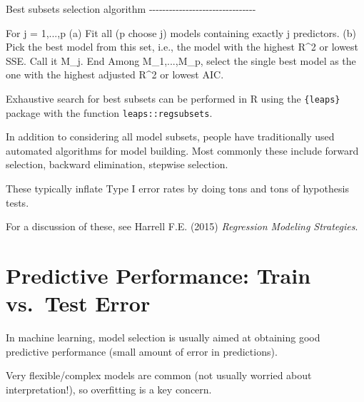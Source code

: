 \documentclass[
  letterpaper,
  DIV=11,
  numbers=noendperiod]{scrreport}
\newenvironment{Shaded}{\begin{snugshade}}{\end{snugshade}}
\newcommand{\DecValTok}[1]{\textcolor[rgb]{0.68,0.00,0.00}{#1}}
\newcommand{\KeywordTok}[1]{\textcolor[rgb]{0.00,0.23,0.31}{#1}}
\newcommand{\NormalTok}[1]{\textcolor[rgb]{0.00,0.23,0.31}{#1}}
\newcommand{\OperatorTok}[1]{\textcolor[rgb]{0.37,0.37,0.37}{#1}}
\begin{document}
\begin{Shaded}
\begin{Highlighting}[]
\NormalTok{Best subsets selection algorithm}
\OperatorTok{{-}{-}{-}{-}{-}{-}{-}{-}{-}{-}{-}{-}{-}{-}{-}{-}{-}{-}{-}{-}{-}{-}{-}{-}{-}{-}{-}{-}{-}{-}{-}{-}}
  
\NormalTok{For j }\OperatorTok{=} \DecValTok{1}\OperatorTok{,...,}\NormalTok{p}
  \OperatorTok{(}\NormalTok{a}\OperatorTok{)}\NormalTok{ Fit all }\OperatorTok{(}\NormalTok{p choose j}\OperatorTok{)}\NormalTok{ models containing exactly j predictors}\OperatorTok{.}
  \OperatorTok{(}\NormalTok{b}\OperatorTok{)}\NormalTok{ Pick the best model from }\KeywordTok{this}\NormalTok{ set}\OperatorTok{,}\NormalTok{ i}\OperatorTok{.}\NormalTok{e}\OperatorTok{.,}\NormalTok{ the model with the highest R}\OperatorTok{\^{}}\DecValTok{2}
      \KeywordTok{or}\NormalTok{ lowest SSE}\OperatorTok{.}\NormalTok{ Call it M\_j}\OperatorTok{.}
\NormalTok{End}
\NormalTok{Among M\_1}\OperatorTok{,...,}\NormalTok{M\_p}\OperatorTok{,}\NormalTok{ select the single best model as the one with the highest}
\NormalTok{adjusted R}\OperatorTok{\^{}}\DecValTok{2} \KeywordTok{or}\NormalTok{ lowest AIC}\OperatorTok{.}
\end{Highlighting}
\end{Shaded}

Exhaustive search for best subsets can be performed in R using the
\texttt{\{leaps\}} package with the function \texttt{leaps::regsubsets}.

In addition to considering all model subsets, people have traditionally
used automated algorithms for model building. Most commonly these
include forward selection, backward elimination, stepwise selection.

These typically inflate Type I error rates by doing tons and tons of
hypothesis tests.

For a discussion of these, see Harrell F.E. (2015) \emph{Regression
Modeling Strategies}.

\hypertarget{predictive-performance-train-vs.-test-error}{%
\section{Predictive Performance: Train vs.~Test
Error}\label{predictive-performance-train-vs.-test-error}}

In machine learning, model selection is usually aimed at obtaining good
predictive performance (small amount of error in predictions).

Very flexible/complex models are common (not usually worried about
interpretation!), so overfitting is a key concern.
\end{document}

